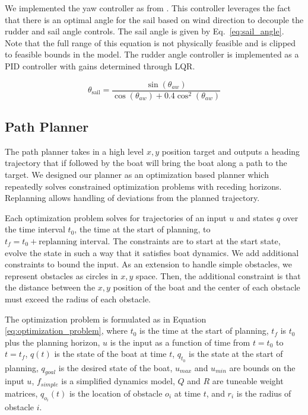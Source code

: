 \documentclass[conference]{IEEEtran}
\begin{document}
We implemented the yaw controller as from \cite{Buehler2018}.
This controller leverages the fact that there is an optimal angle for the sail based on wind direction to decouple the rudder and sail angle controls. The sail angle is given by Eq.~\ref{eq:sail_angle}. Note that the full range of this equation is not physically feasible and is clipped to feasible bounds in the model. The rudder angle controller is implemented as a PID controller with gains determined through LQR.

\begin{equation}
    \theta_{\text{sail}} = \frac{\sin(\theta_{aw})}{\cos(\theta_{aw}) + 0.4\cos^2(\theta_{aw})}
    \label{eq:sail_angle}
\end{equation}

\subsection{Path Planner}

The path planner takes in a high level \(x,y\) position target and outputs a heading trajectory that if followed by the boat will bring the boat along a path to the target. We designed our planner as an optimization based planner which repeatedly solves constrained optimization problems with receding horizons. Replanning allows handling of deviations from the planned trajectory. 

Each optimization problem solves for trajectories of an input \(u\) and states \(q\) over the time interval 
\(t_0\), the time at the start of planning, to \(t_f = t_0 + \text{replanning interval}\). The constraints are to start at the start state, evolve the state in such a way that it satisfies boat dynamics. We add additional constraints to bound the input. As an extension to handle simple obstacles, we represent obstacles as circles in \(x, y\) space. Then, the additional constraint is that the distance between the \(x, y\) position of the boat and the center of each obstacle must exceed the radius of each obstacle.

The optimization problem is formulated as in Equation \ref{eq:optimization_problem}, where \(t_0\) is the time at the start of planning, \(t_f\) is \(t_0\) plus the planning horizon, \(u\) is the input as a function of time from \(t=t_0\) to \(t=t_f\), \(q(t)\) is the state of the boat at time \(t\), \(q_{t_0}\) is the state at the start of planning, \(q_{goal}\) is the desired state of the boat, \(u_{max}\) and \(u_{min}\) are bounds on the input \(u\), \(f_{simple}\) is a simplified dynamics model, \(Q\) and \(R\) are tuneable weight matrices, \(q_{o_i}(t)\) is the location of obstacle \(o_i\) at time \(t\), and \(r_i\) is the radius of obstacle \(i\).
\end{document}
